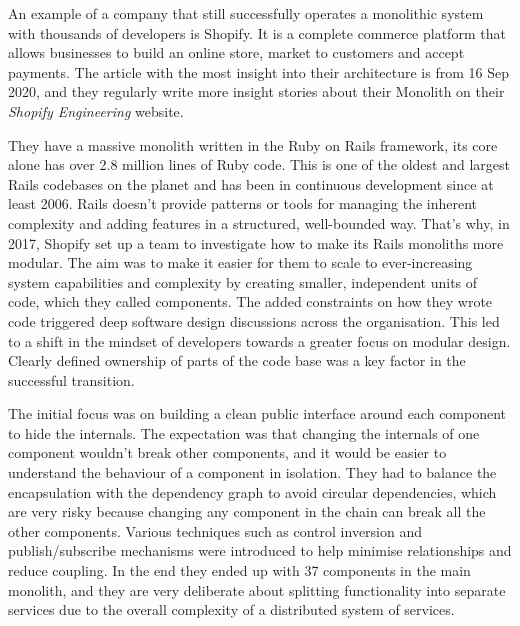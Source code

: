 \begin{example}[Shopify]
    An example of a company that still successfully operates a monolithic system with thousands of developers is Shopify. It is a complete commerce platform that allows businesses to build an online store, market to customers and accept payments. The article\cite{SHOPIFY_MONOLITH_ARTICLE} with the most insight into their architecture is from 16 Sep 2020, and they regularly write more insight stories about their Monolith on their \textit{Shopify Engineering}\cite{SHOPIFY_ENGINEERING} website.

    They have a massive monolith written in the Ruby on Rails framework, its core alone has over 2.8 million lines of Ruby code. This is one of the oldest and largest Rails codebases on the planet and has been in continuous development since at least 2006. Rails doesn't provide patterns or tools for managing the inherent complexity and adding features in a structured, well-bounded way. That's why, in 2017, Shopify set up a team to investigate how to make its Rails monoliths more modular. The aim was to make it easier for them to scale to ever-increasing system capabilities and complexity by creating smaller, independent units of code, which they called components. The added constraints on how they wrote code triggered deep software design discussions across the organisation. This led to a shift in the mindset of developers towards a greater focus on modular design. Clearly defined ownership of parts of the code base was a key factor in the successful transition. \cite{SHOPIFY_MONOLITH_ARTICLE}

    The initial focus was on building a clean public interface around each component to hide the internals. The expectation was that changing the internals of one component wouldn't break other components, and it would be easier to understand the behaviour of a component in isolation. They had to balance the encapsulation with the dependency graph to avoid circular dependencies, which are very risky because changing any component in the chain can break all the other components. Various techniques such as control inversion and publish/subscribe mechanisms were introduced to help minimise relationships and reduce coupling. In the end they ended up with 37 components in the main monolith, and they are very deliberate about splitting functionality into separate services due to the overall complexity of a distributed system of services. \cite{SHOPIFY_MONOLITH_ARTICLE}
\end{example}

